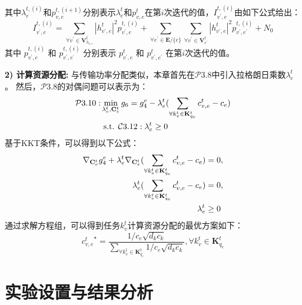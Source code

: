 其中$\lambda_{e}^{t,(i)}$和$p_{v, e}^{t, (i+1)}$分别表示$\lambda_{e}^{t}$和$p_{v, e}^{t}$在第$i$次迭代的值，${I}_{v^{\prime}, e}^{t, (i)}$由如下公式给出：
\begin{equation}
	{I}_{v^{\prime}, e}^{t, (i)} = \sum\limits_{\forall v^{\prime} \in \mathbf{V}_{h_{v, e}}^{t}} |h_{v^{\prime}, e}^t|^2 p_{v^{\prime}, e}^{t, (i)} + \sum\limits_{\forall e^{\prime} \in \mathbf{E} / \{e\}} \sum\limits_{\forall v^{\prime} \in \mathbf{V}_{e^{\prime}}^{t}} |h_{v^{\prime}, e}^t|^2 p_{v^{\prime}, e^{\prime}}^{t, (i)} + N_{0}
\end{equation}
其中 $p_{v^{\prime}, e}^{t, (i)}$ 和 $p_{v^{\prime}, e^{\prime}}^{t, (i)}$ 分别表示 $p_{v^{\prime}, e}^{t}$ 和 $p_{v^{\prime}, e^{\prime}}^{t}$ 在第$i$次迭代的值。

\textbf{2) 计算资源分配:} 与传输功率分配类似，本章首先在$\mathcal{P}3.8$中引入拉格朗日乘数${\lambda}_{e}^{t}$。
然后，$\mathcal{P}3.8$的对偶问题可以表示为：
\begin{align}
	\mathcal{P}3.10: & \min_{\mathbf{\lambda}_{e}^{t}, \mathbf{{C}}_{e}^{t}}  g_6 = g_4^e - {\lambda}_{e}^{t} (\sum_{\forall k_{v}^{t} \in {\mathbf{K}_{q_e}^{t} }} {c_{v, e}^t} - c_{e} ) \notag \\
		&\text { s.t. } \mathcal{C}3.12: \mathbf{\lambda}_{e}^{t} \geq 0 
\end{align}
基于KKT条件\cite{boyd2004convex}，可以得到以下公式：
\begin{align}
	\nabla_{\mathbf{C}_e^{t}} g_4^e + \mathbf{\lambda}_{e}^{t}\nabla_{\mathbf{C}_e^{t}} (\sum_{\forall k_{v}^{t} \in {\mathbf{K}_{q_e}^{t} }} {c_{v, e}^t} - c_{e} ) &= 0, \notag \\
	\mathbf{\lambda}_{e}^{t}( \sum_{\forall k_{v}^{t} \in {\mathbf{K}_{q_e}^{t} }} {c_{v, e}^t} - {c_{e}} ) &= 0, \notag \\
	\mathbf{\lambda}_{e}^{t} &\geq 0
\end{align}
通过求解方程组，可以得到任务$k_{v}^{t}$计算资源分配的最优方案如下：
\begin{equation}
	{c_{v, e}^{t}}^{\star} = \frac{1 / c_e \sqrt{d_k  c_k} } {\sum_{\forall k_{v}^{t} \in {\mathbf{K}_{q_e}^{t} }} 1 / c_e \sqrt{d_k  c_k}} , \forall k_{v}^{t} \in {\mathbf{K}_{q_e}^{t} } 
\end{equation}

\section[\hspace{-2pt}实验设置与结果分析]{{ \hspace{-8pt}实验设置与结果分析}}\label{section 3-5}

